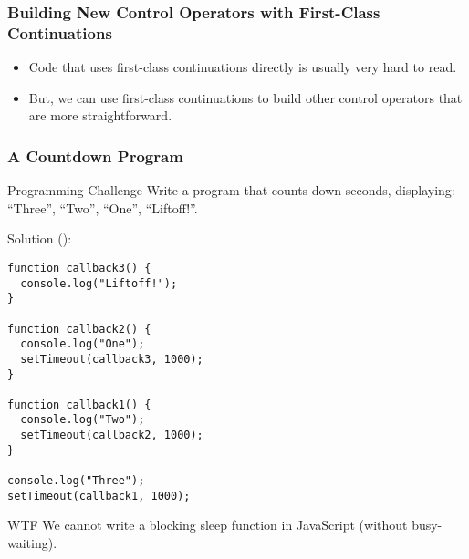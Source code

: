 \documentclass[8pt,pdf]{beamer}
\begin{document}
\begin{frame}[fragile]
\frametitle{Building New Control Operators with First-Class Continuations}

\begin{itemize}

  \item Code that uses first-class continuations directly is usually very hard
  to read.

  \item But, we can use first-class continuations to build other control
  operators that are more straightforward.

\end{itemize}

\end{frame}

\begin{frame}[fragile]
\frametitle{A Countdown Program}

\begin{block}{Programming Challenge}
Write a program that counts down seconds, displaying: ``Three'', ``Two'', ``One'', ``Liftoff!''.
\end{block}

\pause

Solution ():
\begin{lstlisting}
function callback3() {
  console.log("Liftoff!");
}

function callback2() {
  console.log("One");
  setTimeout(callback3, 1000);
}

function callback1() {
  console.log("Two");
  setTimeout(callback2, 1000);
}

console.log("Three");
setTimeout(callback1, 1000);
\end{lstlisting}

\pause

\begin{alertblock}{WTF}
We cannot write a blocking sleep function in JavaScript (without busy-waiting).
\end{alertblock}

\end{frame}
\end{document}
